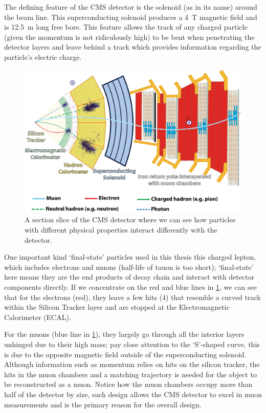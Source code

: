 The defining feature of the CMS detector is the solenoid (as in its name) around the beam line.
This superconducting solenoid produces a \SI{4}{\tesla} magnetic field and is 
\SI{12.5}{\meter} long free bore.\cite{validation_cms} This feature allows the track of
any charged particle (given the momentum is not ridiculously high) to be bent when penetrating
the detector layers and leave behind a track which provides information regarding the particle's 
electric charge.


\begin{figure}[htb]
\begin{center}
\includegraphics[width=.75\linewidth]{fig/CMS_Slice.png}
\end{center}
\caption{A section slice of the CMS detector where we can see how 
particles with different physical properties interact differently with the detector.}
\label{fig:CMS_Slice}
\end{figure}

One important kind `final-state' particles used in this thesis this charged lepton, 
which includes electrons and muons (half-life of tauon is too short);
`final-state' here means they are the end products of decay chain and interact with detector
components directly. If we concentrate on the red and blue lines in \ref{fig:CMS_Slice}, we
can see that for the electrons (red), they leave a few hits (4) that resemble a curved
track within the Silicon Tracker layer and are stopped at the Electromagnetic Calorimeter
(ECAL). 

For the muons (blue line in \ref{fig:CMS_Slice}), they largely go through all the interior layers unhinged due to their
high mass; pay close attention to the `S'-shaped curve, this is due to the opposite magnetic
field outside of the superconducting solenoid. Although information such as momentum relies on
hits on the silicon tracker, the hits in the muon chambers and a matching trajectory is needed 
for the object to be reconstructed as a muon. Notice how the
muon chambers occupy more than half of the detector by size, such design allows the CMS 
detector to excel in muon measurements and is the primary reason for the overall design.

